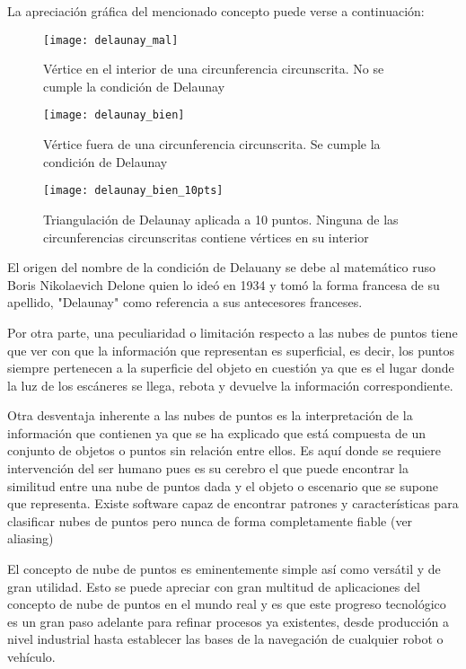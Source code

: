 La apreciación gráfica del mencionado concepto puede verse a continuación:

\begin{figure}[!htb]
  \texttt{[image: delaunay\_mal]}
  \caption{Vértice en el interior de una circunferencia circunscrita. No se cumple la condición de Delaunay}\label{fig:del_mal}
\endminipage\hfill
{}
  \texttt{[image: delaunay\_bien]}
  \caption{Vértice fuera de una circunferencia circunscrita. Se cumple la condición de Delaunay}\label{fig:del_bien}
\endminipage\hfill
{}%
  \texttt{[image: delaunay\_bien\_10pts]}
  \caption{Triangulación de Delaunay aplicada a 10 puntos. Ninguna  de las circunferencias circunscritas contiene vértices en su interior}\label{fig:del_bien_10pts}
\endminipage
\end{figure}



El origen del nombre de la condición de Delauany se debe al matemático ruso Boris Nikolaevich Delone quien lo ideó en 1934 y tomó la forma francesa de su apellido, "Delaunay" como referencia a sus antecesores franceses.


Por otra parte, una peculiaridad o limitación respecto a las nubes de puntos tiene que ver con que la
información que representan es superficial, es decir, los puntos siempre pertenecen a la superficie del
objeto en cuestión ya que es el lugar donde la luz de los escáneres se llega, rebota y devuelve la
información correspondiente.

Otra desventaja inherente a las nubes de puntos es la interpretación de la información que contienen ya
que se ha explicado que está compuesta de un conjunto de objetos o puntos sin relación entre ellos. Es
aquí donde se requiere intervención del ser humano pues es su cerebro el que puede encontrar la similitud
entre una nube de puntos dada y el objeto o escenario que se supone que representa. Existe software capaz
de encontrar patrones y características para clasificar nubes de puntos pero nunca de forma
completamente fiable (ver aliasing)

El concepto de nube de puntos es eminentemente simple así como versátil y de gran utilidad. Esto se puede apreciar con gran multitud de aplicaciones del concepto de nube de puntos en el mundo real y es que este progreso tecnológico es un gran paso adelante para refinar procesos ya existentes, desde producción a nivel industrial hasta establecer las bases de la navegación de cualquier robot o vehículo.


